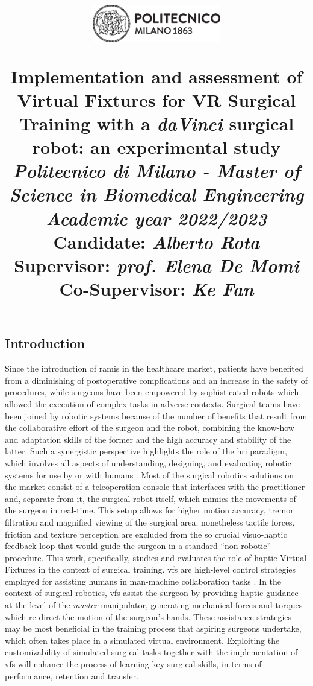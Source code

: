 \documentclass{article}
\title{
\begin{figure}[h!]
\centering
\includegraphics[width=0.5\textwidth]{images/logo_polimi_scritta2.eps}
\end{figure}
\textbf{Implementation and assessment of Virtual Fixtures for VR Surgical Training with a \textit{daVinci} surgical robot: an experimental study}
\\
\vspace{0.5cm}\large{\textit{Politecnico di Milano - Master of Science in Biomedical Engineering}}
\\
\vspace{0.5cm}\textit{\small{Academic year 2022/2023}}\vspace{0.5cm}\\
{\large \textbf{Candidate: \textit{Alberto Rota}}\\
\textbf{Supervisor: \textit{prof. Elena De Momi}}\\
\textbf{Co-Supervisor: \textit{Ke Fan}}}}
\author{}
\date{}
\begin{document}
\maketitle
\begin{multicols}{2}
\section{Introduction}
Since the introduction of \ac{ramis} in the healthcare market, patients have benefited from a diminishing of postoperative complications and an increase in the safety of procedures, while surgeons have been empowered by sophisticated robots which allowed the execution of complex tasks in adverse contexts. 
\newline
Surgical teams have been joined by robotic systems because of the number of benefits that result from the collaborative effort of the surgeon and the robot, combining the know-how and adaptation skills of the former and the high accuracy and stability of the latter. Such a synergistic perspective highlights the role of the \ac{hri} paradigm, which involves all aspects of understanding, designing, and evaluating robotic systems for use by or with humans \cite{Goodrich2007}. Most of the surgical robotics solutions on the market consist of a teleoperation console that interfaces with the practitioner and, separate from it, the surgical robot itself, which mimics the movements of the surgeon in real-time. This setup allows for higher motion accuracy, tremor filtration and magnified viewing of the surgical area; nonetheless tactile forces, friction and texture perception are excluded from the so crucial visuo-haptic feedback loop that would guide the surgeon in a standard ``non-robotic'' procedure.
\newline
This work, specifically, studies and evaluates the role of haptic Virtual Fixtures in the context of surgical training. \acp{vf} are high-level control strategies employed for assisting humans in man-machine collaboration tasks \cite{Bowyer2014}. In the context of surgical robotics, \acp{vf} assist the surgeon by providing haptic guidance at the level of the \textit{master} manipulator, generating mechanical forces and torques which re-direct the motion of the surgeon's hands. These assistance strategies may be most beneficial in the training process that aspiring surgeons undertake, which often takes place in a simulated virtual environment. Exploiting the customizability of simulated surgical tasks together with the implementation of \acp{vf} will enhance the process of learning key surgical skills, in terms of performance, retention and transfer.

\end{multicols}
\end{document}
